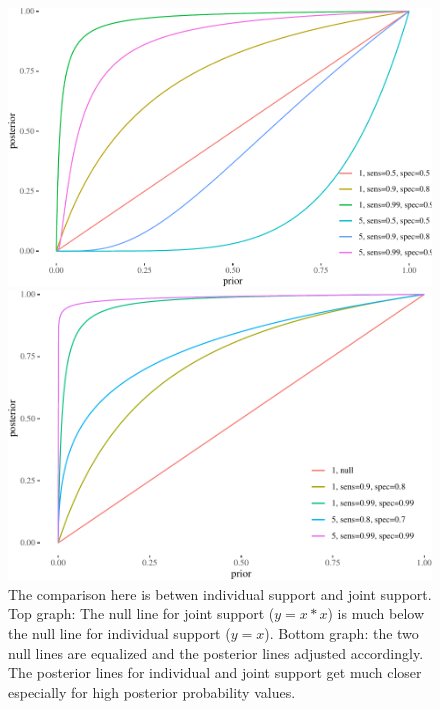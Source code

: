 \documentclass[10pt,dvipsnames,enabledeprecatedfontcommands]{scrartcl}
\begin{document}
\begin{figure}


\begin{center}\includegraphics[width=0.9\linewidth]{conjunction-paradox_files/figure-latex/unnamed-chunk-4-1} \end{center}


\begin{center}\includegraphics[width=0.9\linewidth]{conjunction-paradox_files/figure-latex/unnamed-chunk-5-1} \end{center}

\caption{The comparison here is betwen individual support and joint support. 
Top graph: The null line for joint support ($y=x*x$) is 
much below the null line for individual support ($y=x$).
Bottom graph: the two null lines are equalized and the 
posterior lines adjusted accordingly. The posterior lines for individual 
and joint support get much closer especially for 
high posterior probability values.}
\label{fig:post-indiv-joint}
\end{figure}
\end{document}
